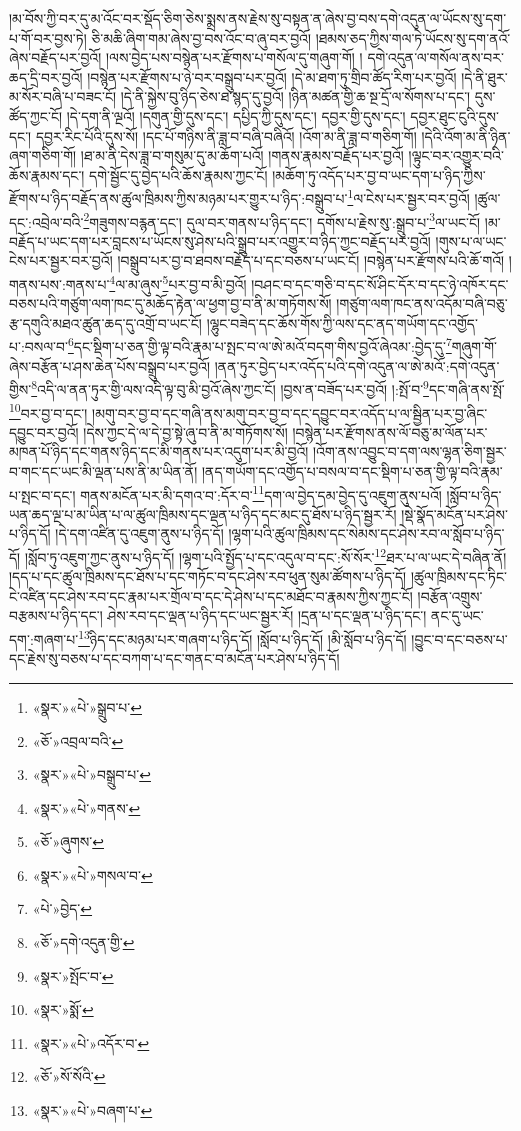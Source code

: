།མ་བོས་ཀྱི་བར་དུ་མ་འོང་བར་སྡོད་ཅིག་ཅེས་སྨྲས་ནས་རྗེས་སུ་བསྟན་ན་ཞེས་བྱ་བས་དགེ་འདུན་ལ་ཡོངས་སུ་དག་པ་གོ་བར་བྱས་ཏེ། ཅི་མཆི་ཞིག་གམ་ཞེས་བྱ་བས་འོང་བ་ཞུ་བར་བྱའོ། །ཐམས་ཅད་ཀྱིས་གལ་ཏེ་ཡོངས་སུ་དག་ནའོ་ཞེས་བརྗོད་པར་བྱའོ། །ལས་བྱེད་པས་བསྙེན་པར་རྫོགས་པ་གསོལ་དུ་གཞུག་གོ། །
དགེ་འདུན་ལ་གསོལ་ནས་བར་ཆད་དྲི་བར་བྱའོ། །བསྙེན་པར་རྫོགས་པ་ཉེ་བར་བསྒྲུབ་པར་བྱའོ། །དེ་མ་ཐག་ཏུ་གྲིབ་ཚོད་རིག་པར་བྱའོ། །དེ་ནི་ཐུར་མ་སོར་བཞི་པ་བཟང་ངོ། །དེ་ནི་སྐྱེས་བུ་ཉིད་ཅེས་ཐ་སྙད་དུ་བྱའོ། །ཉིན་མཚན་གྱི་ཆ་སྔ་དྲོ་ལ་སོགས་པ་དང་། དུས་ཚོད་ཀྱང་ངོ། །དེ་དག་ནི་ལྔའོ། །དགུན་གྱི་དུས་དང་། དཔྱིད་ཀྱི་དུས་དང་། དབྱར་གྱི་དུས་དང་། དབྱར་ཐུང་ངུའི་དུས་དང་། དབྱར་རིང་པོའི་དུས་སོ། །དང་པོ་གཉིས་ནི་ཟླ་བ་བཞི་བཞིའོ། །འོག་མ་ནི་ཟླ་བ་གཅིག་གོ། །དེའི་འོག་མ་ནི་ཉིན་ཞག་གཅིག་གོ། །ཐ་མ་ནི་དེས་ཟླ་བ་གསུམ་དུ་མ་ཆོག་པའོ། །གནས་རྣམས་བརྗོད་པར་བྱའོ། །ལྟུང་བར་འགྱུར་བའི་ཆོས་རྣམས་དང་། དགེ་སྦྱོང་དུ་བྱེད་པའི་ཆོས་རྣམས་ཀྱང་ངོ། །མཆོག་ཏུ་འདོད་པར་བྱ་བ་ཡང་དག་པ་ཉིད་ཀྱིས་རྫོགས་པ་ཉིད་བརྗོད་ནས་ཚུལ་ཁྲིམས་ཀྱིས་མཉམ་པར་གྱུར་པ་ཉིད་:བསྒྲུབ་པ་\footnote{«སྣར་»«པེ་»སྒྲུབ་པ་}ལ་ངེས་པར་སྦྱར་བར་བྱའོ། །ཚུལ་དང་:འབྲེལ་བའི་\footnote{«ཅོ་»འབྲལ་བའི་}གཟུགས་བརྙན་དང་། དུལ་བར་གནས་པ་ཉིད་དང་། དགོས་པ་རྗེས་སུ་:སྒྲུབ་པ་\footnote{«སྣར་»«པེ་»བསྒྲུབ་པ་}ལ་ཡང་ངོ། །མ་བརྗོད་པ་ཡང་དག་པར་བླངས་པ་ཡོངས་སུ་ཤེས་པའི་སྒྲུབ་པར་འགྱུར་བ་ཉིད་ཀྱང་བརྗོད་པར་བྱའོ། །གུས་པ་ལ་ཡང་ངེས་པར་སྦྱར་བར་བྱའོ། །བསྒྲུབ་པར་བྱ་བ་ཐབས་བརྗོད་པ་དང་བཅས་པ་ཡང་ངོ། །བསྙེན་པར་རྫོགས་པའི་ཆོ་གའོ། །གནས་པས་:གནས་པ་\footnote{«སྣར་»«པེ་»གནས་}ལ་མ་ཞུས་\footnote{«ཅོ་»ཞུགས་}པར་བྱ་བ་མི་བྱའོ། །བཤང་བ་དང་གཅི་བ་དང་སོ་ཤིང་དོར་བ་དང་ཉེ་འཁོར་དང་བཅས་པའི་གཙུག་ལག་ཁང་དུ་མཆོད་རྟེན་ལ་ཕྱག་བྱ་བ་ནི་མ་གཏོགས་སོ། །གཙུག་ལག་ཁང་ནས་འདོམ་བཞི་བཅུ་རྩ་དགུའི་མཐའ་ཚུན་ཆད་དུ་འགྲོ་བ་ཡང་ངོ། །ལྷུང་བཟེད་དང་ཆོས་གོས་ཀྱི་ལས་དང་ནད་གཡོག་དང་འགྱོད་པ་:བསལ་བ་\footnote{«སྣར་»«པེ་»གསལ་བ་}དང་སྡིག་པ་ཅན་གྱི་ལྟ་བའི་རྣམ་པ་སྤང་བ་ལ་ཨེ་མའོ་བདག་གིས་བྱའོ་ཞེའམ་:བྱེད་དུ་\footnote{«པེ་»བྱེད་}གཞུག་གོ་ཞེས་བརྩོན་པ་ཤས་ཆེན་པོས་བསྒྲུབ་པར་བྱའོ། །ནན་ཏུར་བྱེད་པར་འདོད་པའི་དགེ་འདུན་ལ་ཨེ་མའོ་:དགེ་འདུན་གྱིས་\footnote{«ཅོ་»དགེ་འདུན་གྱི་}འདི་ལ་ནན་ཏུར་གྱི་ལས་འདི་ལྟ་བུ་མི་བྱའོ་ཞེས་ཀྱང་ངོ། །བྱས་ན་བཟོད་པར་བྱའོ། །:སྤོ་བ་\footnote{«སྣར་»སྤོང་བ་}དང་གཞི་ནས་སྤོ་\footnote{«སྣར་»སྨོ་}བར་བྱ་བ་དང་། །མགུ་བར་བྱ་བ་དང་གཞི་ནས་མགུ་བར་བྱ་བ་དང་དབྱུང་བར་འདོད་པ་ལ་སྦྱིན་པར་བྱ་ཞིང་དབྱུང་བར་བྱའོ། །དེས་ཀྱང་དེ་ལ་དེ་བྱ་སྟེ་ཞུ་བ་ནི་མ་གཏོགས་སོ། །བསྙེན་པར་རྫོགས་ནས་ལོ་བཅུ་མ་ལོན་པར་མཁན་པོ་ཉིད་དང་གནས་ཉིད་དང་མི་གནས་པར་འདུག་པར་མི་བྱའོ། །འོག་ནས་འབྱུང་བ་དག་ལས་ལྷན་ཅིག་སྦྱར་བ་གང་དང་ཡང་མི་ལྡན་པས་ནི་མ་ཡིན་ནོ། །ནད་གཡོག་དང་འགྱོད་པ་བསལ་བ་དང་སྡིག་པ་ཅན་གྱི་ལྟ་བའི་རྣམ་པ་སྤང་བ་དང་། གནས་མངོན་པར་མི་དགའ་བ་:དོར་བ་\footnote{«སྣར་»«པེ་»འདོར་བ་}དག་ལ་བྱེད་དམ་བྱེད་དུ་འཇུག་ནུས་པའོ། །སློབ་པ་ཉིད་ཡན་ཆད་ལྔ་པ་མ་ཡིན་པ་ལ་ཚུལ་ཁྲིམས་དང་ལྡན་པ་ཉིད་དང་མང་དུ་ཐོས་པ་ཉིད་སྦྱར་རོ། །སྡེ་སྣོད་མངོན་པར་ཤེས་པ་ཉིད་དོ། །དེ་དག་འཛིན་དུ་འཇུག་ནུས་པ་ཉིད་དོ། །ལྷག་པའི་ཚུལ་ཁྲིམས་དང་སེམས་དང་ཤེས་རབ་ལ་སློབ་པ་ཉིད་དོ། །སློབ་ཏུ་འཇུག་ཀྱང་ནུས་པ་ཉིད་དོ། །ལྷག་པའི་སྤྱོད་པ་དང་འདུལ་བ་དང་:སོ་སོར་\footnote{«ཅོ་»སོ་སོའི་}ཐར་པ་ལ་ཡང་དེ་བཞིན་ནོ། །དད་པ་དང་ཚུལ་ཁྲིམས་དང་ཐོས་པ་དང་གཏོང་བ་དང་ཤེས་རབ་ཕུན་སུམ་ཚོགས་པ་ཉིད་དོ། །ཚུལ་ཁྲིམས་དང་ཏིང་ངེ་འཛིན་དང་ཤེས་རབ་དང་རྣམ་པར་གྲོལ་བ་དང་དེ་ཤེས་པ་དང་མཐོང་བ་རྣམས་ཀྱིས་ཀྱང་ངོ། །བརྩོན་འགྲུས་བརྩམས་པ་ཉིད་དང་། ཤེས་རབ་དང་ལྡན་པ་ཉིད་དང་ཡང་སྦྱར་རོ། །དྲན་པ་དང་ལྡན་པ་ཉིད་དང་། ནང་དུ་ཡང་དག་:གཞག་པ་\footnote{«སྣར་»«པེ་»བཞག་པ་}ཉིད་དང་མཉམ་པར་གཞག་པ་ཉིད་དོ། །སློབ་པ་ཉིད་དོ། །མི་སློབ་པ་ཉིད་དོ། །བྱུང་བ་དང་བཅས་པ་དང་རྗེས་སུ་བཅས་པ་དང་བཀག་པ་དང་གནང་བ་མངོན་པར་ཤེས་པ་ཉིད་དོ། 